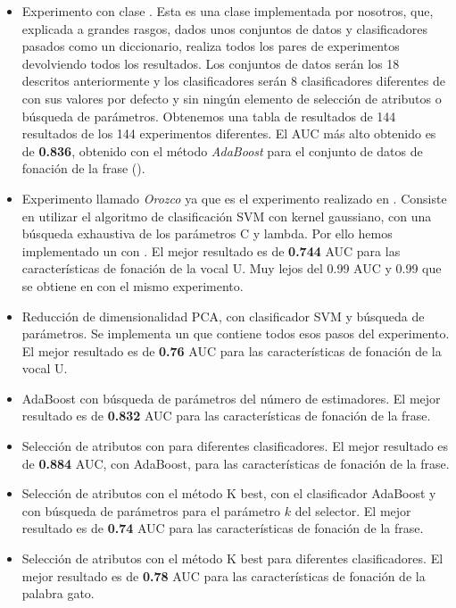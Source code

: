 \begin{itemize}
\item  Experimento con clase . Esta es una clase implementada por nosotros, que, explicada a grandes rasgos, dados unos conjuntos de datos y clasificadores pasados como un diccionario, realiza todos los pares de experimentos devolviendo todos los resultados. Los conjuntos de datos serán los 18 descritos anteriormente y los clasificadores serán 8 clasificadores diferentes de  con sus valores por defecto y sin ningún elemento de selección de atributos o búsqueda de parámetros. Obtenemos una tabla de resultados de 144 resultados de los 144 experimentos diferentes. El AUC más alto obtenido es de \textbf{0.836}, obtenido con el método \textit{AdaBoost} para el conjunto de datos de fonación de la frase ().
\item Experimento llamado \textit{Orozco} ya que es el experimento realizado en \cite{Orz2016}. Consiste en utilizar el algoritmo de clasificación SVM con kernel gaussiano, con una búsqueda exhaustiva de los parámetros C y lambda. Por ello hemos implementado un  con . El mejor resultado es de \textbf{0.744} AUC para las características de fonación de la vocal U. Muy lejos del 0.99 AUC y 0.99  que se obtiene en \cite{Orz2016} con el mismo experimento.
\item Reducción de dimensionalidad PCA, con clasificador SVM y búsqueda de parámetros. Se implementa un  que contiene todos esos pasos del experimento. El mejor resultado es de \textbf{0.76} AUC para las características de fonación de la vocal U.
\item AdaBoost con búsqueda de parámetros del número de estimadores. El mejor resultado es de \textbf{0.832} AUC para las características de fonación de la frase.
\item Selección de atributos con  para diferentes clasificadores. El mejor resultado es de \textbf{0.884} AUC, con AdaBoost, para las características de fonación de la frase.
\item Selección de atributos con el método K best, con el clasificador AdaBoost y con búsqueda de parámetros para el parámetro $k$ del selector. El mejor resultado es de \textbf{0.74} AUC para las características de fonación de la frase.
\item Selección de atributos con el método K best para diferentes clasificadores. El mejor resultado es de \textbf{0.78} AUC para las características de fonación de la palabra gato.
\end{itemize}


